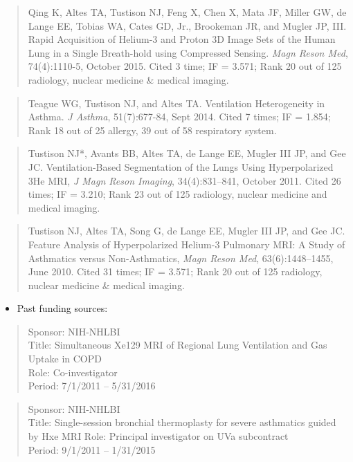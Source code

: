 \documentclass[11pt,]{article}
\providecommand{\tightlist}{%
  \setlength{\itemsep}{0pt}\setlength{\parskip}{0pt}}
\begin{document}
\begin{itemize}
  \begin{quote}
  Qing K, Altes TA, Tustison NJ, Feng X, Chen X, Mata JF, Miller GW, de
  Lange EE, Tobias WA, Cates GD, Jr., Brookeman JR, and Mugler JP, III.
  Rapid Acquisition of Helium-3 and Proton 3D Image Sets of the Human
  Lung in a Single Breath-hold using Compressed Sensing. \emph{Magn
  Reson Med}, 74(4):1110-5, October 2015. Cited 3 time; IF = 3.571; Rank
  20 out of 125 radiology, nuclear medicine \& medical imaging.
  \end{quote}

  \begin{quote}
  Teague WG, Tustison NJ, and Altes TA. Ventilation Heterogeneity in
  Asthma. \emph{J Asthma}, 51(7):677-84, Sept 2014. Cited 7 times; IF =
  1.854; Rank 18 out of 25 allergy, 39 out of 58 respiratory system.
  \end{quote}

  \begin{quote}
  Tustison NJ*, Avants BB, Altes TA, de Lange EE, Mugler III JP, and Gee
  JC. Ventilation-Based Segmentation of the Lungs Using Hyperpolarized
  3He MRI, \emph{J Magn Reson Imaging}, 34(4):831--841, October 2011.
  Cited 26 times; IF = 3.210; Rank 23 out of 125 radiology, nuclear
  medicine and medical imaging.
  \end{quote}

  \begin{quote}
  Tustison NJ, Altes TA, Song G, de Lange EE, Mugler III JP, and Gee JC.
  Feature Analysis of Hyperpolarized Helium-3 Pulmonary MRI: A Study of
  Asthmatics versus Non-Asthmatics, \emph{Magn Reson Med},
  63(6):1448--1455, June 2010. Cited 31 times; IF = 3.571; Rank 20 out
  of 125 radiology, nuclear medicine \& medical imaging.
  \end{quote}

  \begin{itemize}
  \tightlist
  \item
    Past funding sources:
  \end{itemize}

  \begin{quote}
  Sponsor: NIH-NHLBI\\
  Title: Simultaneous Xe129 MRI of Regional Lung Ventilation and Gas
  Uptake in COPD\\
  Role: Co-investigator\\
  Period: 7/1/2011 -- 5/31/2016
  \end{quote}

  \begin{quote}
  Sponsor: NIH-NHLBI\\
  Title: Single-session bronchial thermoplasty for severe asthmatics
  guided by Hxe MRI Role: Principal investigator on UVa subcontract\\
  Period: 9/1/2011 -- 1/31/2015
  \end{quote}


\end{itemize}
\end{document}
